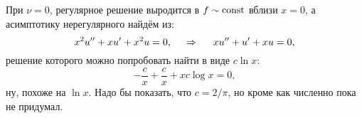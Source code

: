 При $\nu = 0$, регулярное решение выродится в $f \sim \textnormal{const}$ вблизи $x=0$, а асимптотику нерегулярного найдём из:
\begin{equation*}
    x^2 u'' + x u' + x^2 u = 0,
    \hspace{0.5cm} \Rightarrow \hspace{0.5cm}
    x u'' + u' + x u = 0,
\end{equation*}
решение которого можно попробовать найти в виде $c \ln x$:
\begin{equation*}
    -\frac{c}{x} + \frac{c}{x} + x c \log x = 0,
\end{equation*}
ну, похоже на $\ln x$. Надо бы показать, что $c = 2 / \pi$, но кроме как численно пока не придумал. 

